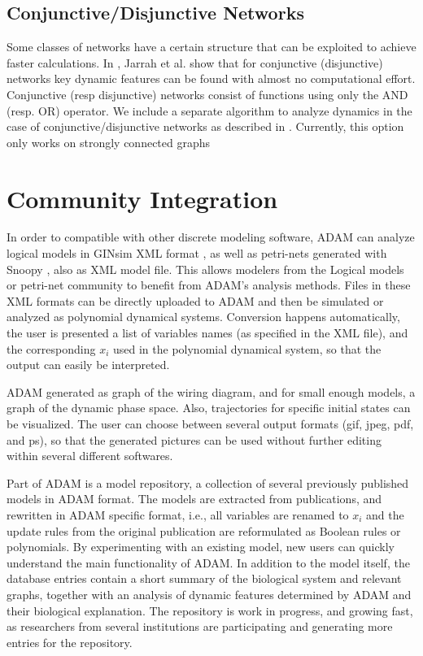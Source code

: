 \documentclass[11pt]{amsart}
\begin{document}
\subsection{Conjunctive/Disjunctive Networks}
Some classes of networks have a certain structure that can be
exploited to achieve faster calculations. In \cite{conjunctive}, Jarrah et al.
show that for conjunctive (disjunctive) networks key dynamic features can be found with
almost no computational effort. Conjunctive (resp disjunctive) networks consist of
functions using only the AND (resp. OR) operator. 
We include a separate algorithm to analyze 
dynamics in the case of conjunctive/disjunctive networks as described in
\cite{conjunctive}. Currently,
this option only works on strongly connected graphs

\section{Community Integration}
In order to compatible with other discrete modeling software, ADAM can analyze logical models in GINsim XML format \cite{GINsim}, as well as petri-nets generated with Snoopy \cite{Snoopy}, also as XML model file. This allows modelers from the Logical models or petri-net community to benefit from ADAM's analysis methods. Files in these XML formats can be directly uploaded to ADAM and then be simulated or analyzed as polynomial dynamical systems. Conversion happens automatically, the user is presented a list of variables names (as specified in the XML file), and the corresponding $x_i$ used in the polynomial dynamical system, so that the output can easily be interpreted. 

ADAM generated as graph of the wiring diagram, and for small enough models, a graph of the dynamic phase space. Also, trajectories for specific initial states can be visualized. The user can choose between several output formats (gif, jpeg, pdf, and ps), so that the generated pictures can be used without further editing within several different softwares. 

Part of ADAM is a model repository, a collection of several previously published models in ADAM format. The models are extracted from publications, and rewritten in ADAM specific format, i.e., all variables are renamed to $x_i$ and the update rules from the original publication are reformulated as Boolean rules or polynomials. By experimenting with an existing model, new users can quickly understand the main functionality of ADAM. In addition to the model itself, the database entries contain a short summary of the biological system and relevant graphs, together with an analysis of dynamic features determined by ADAM and their biological explanation. The repository is work in progress, and growing fast, as researchers from several institutions are participating and  generating more entries for the repository.
\end{document}
